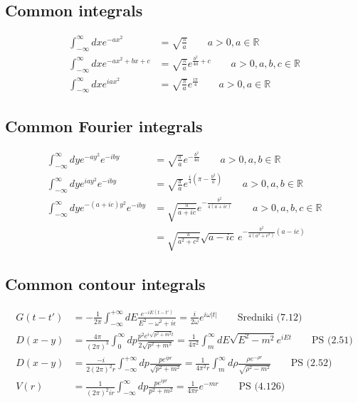 \documentclass[10pt,a4paper]{article}
\theoremstyle{definition}
\begin{document}
\subsection{Common integrals}
\begin{align}
    \int_{-\infty}^\infty dx e^{-ax^2}&=\sqrt{\frac{\pi}{a}} \qquad a>0, a\in\mathbb{R}\\
    \int_{-\infty}^\infty dx e^{-ax^2+bx+c}&=\sqrt{\frac{\pi}{a}}e^{\frac{b^2}{4a}+c} \qquad a>0, a,b,c\in\mathbb{R}\\
    \int_{-\infty}^\infty dx e^{iax^2}&=\sqrt{\frac{\pi}{a}}e^{\frac{i\pi}{4}} \qquad a>0, a\in\mathbb{R}
\end{align}

\subsection{Common Fourier integrals}
\begin{align}
    \int_{-\infty}^\infty dy e^{-ay^2}e^{-iby}&=\sqrt{\frac{\pi}{a}}e^{-\frac{b^2}{4a}} \qquad a>0, a,b\in\mathbb{R}\\
    \int_{-\infty}^\infty dy e^{iay^2}e^{-iby}&=\sqrt{\frac{\pi}{a}}e^{\frac{i}{4}\left(\pi-\frac{b^2}{a}\right)} \qquad a>0, a,b\in\mathbb{R}\\
    \int_{-\infty}^\infty dy e^{-(a+ic)y^2}e^{-iby}&=\sqrt{\frac{\pi}{a+ic}}e^{-\frac{b^2}{4(a+ic)}} \qquad a>0, a,b,c\in\mathbb{R}\\
    &=\sqrt{\frac{\pi}{a^2+c^2}}\sqrt{a-ic}\,e^{-\frac{b^2}{4(a^2+c^2)}(a-ic)}
\end{align}

\subsection{Common contour integrals}
\begin{align}
G(t-t')&=-\frac{1}{2\pi}\int_{-\infty}^{+\infty}dE\frac{e^{-iE(t-t')}}{E^2-\omega^2+i\epsilon}=\frac{i}{2\omega}e^{i\omega|t|}\qquad\text{Sredniki (7.12)}\\
D(x-y)&=\frac{4\pi}{(2\pi)^3}\int_{0}^{\infty} dp\frac{p^2 e^{i\sqrt{p^2+m^2}t}}{2\sqrt{p^2+m^2}}=\frac{1}{4\pi^2}\int_m^\infty dE\sqrt{E^2-m^2}e^{iEt}\qquad \text{PS (2.51)}\\
D(x-y)&=\frac{-i}{2(2\pi)^2r}\int_{-\infty}^{+\infty} dp\frac{p e^{ipr}}{\sqrt{p^2+m^2}}=\frac{1}{4\pi^2 r}\int_m^\infty d\rho\frac{\rho e^{-\rho r}}{\sqrt{\rho^2-m^2}}\qquad\text{PS (2.52)}\\
V(r)&=\frac{1}{(2\pi)^2ir}\int_{-\infty}^\infty dp\frac{p e^{ipr}}{p^2+m^2}=\frac{1}{4\pi r}e^{-mr}\qquad\text{PS (4.126)}
\end{align}
\end{document}
